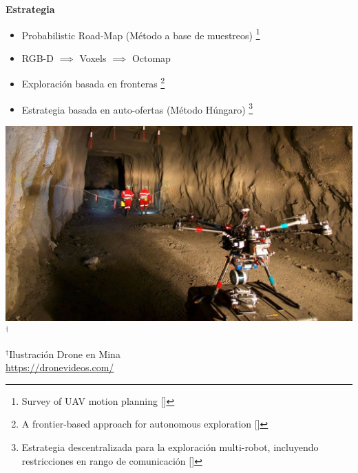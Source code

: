 \documentclass[
  24pt, %
  aspectratio=169, %
]{beamer}
\begin{document}
\begin{frame}
  \begin{minipage}{0.47\textwidth}
    \textbf{Estrategia}
    \begin{itemize}
    \item \small Probabilistic Road-Map (Método a base de muestreos) \footnote{Survey of UAV motion planning [\cite{Quan2020}]}  
    \item \small RGB-D $\implies$ Voxels $\implies$ Octomap
      
    \item \small Exploración basada en fronteras \footnote{A frontier-based approach for autonomous exploration [\cite{613851}]}
    \item \small Estrategia basada en auto-ofertas (Método Húngaro) \footnote{Estrategia descentralizada para la exploración multi-robot, incluyendo restricciones en rango de comunicación [\cite{LEAL2013}]}
      
    \end{itemize}
  \end{minipage}
  \hspace{0.1cm}
  \begin{minipage}{0.5\textwidth}
    \includegraphics[width=\textwidth]{maxresdefault.jpg}$^\dag$\\
    \rule{0in}{1.2em}$^\dag$\scriptsize Ilustración Drone en Mina \\
    \tiny \url{https://dronevideos.com/} 
  \end{minipage}
  
\end{frame}
\end{document}
